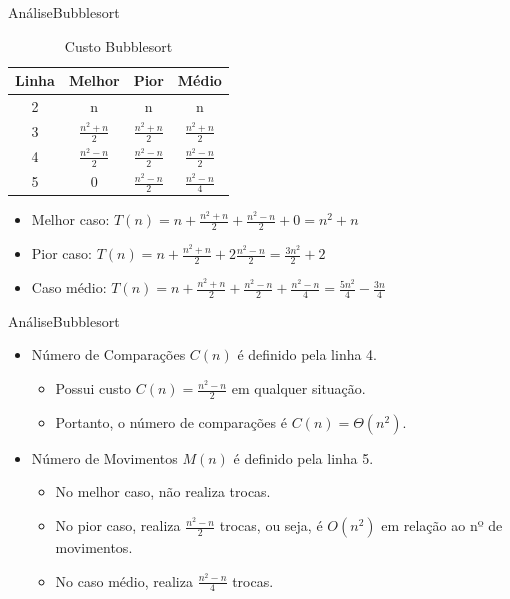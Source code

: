 \documentclass[aspectratio=169]{beamer}
\begin{document}

\begin{frame}[fragile]{Análise}{Bubblesort}
\begin{table}[]
\centering
\caption{Custo Bubblesort}
\label{Custo Bubblesort}
\begin{tabular}{c|ccc}
Linha  &  Melhor  &  Pior  &  Médio  \\
\hline
2       & n  & n  &  n \\
3       & $\frac{n^2 + n}{2}$ & $\frac{n^2 + n}{2}$ & $\frac{n^2 + n}{2}$ \\
4       &$\frac{n^2 - n}{2}$ & $\frac{n^2 - n}{2}$ & $\frac{n^2 - n}{2}$ \\
5       & 0 &$\frac{n^2 - n}{2}$& $\frac{n^2 - n}{4}$ \\ 
\end{tabular}
\end{table} 

\begin{itemize}
 \item Melhor caso: $T(n) = n + \frac{n^2+n}{2} + \frac{n^2-n}{2} + 0 = n^2 + n$

 \item Pior caso: $T(n) = n + \frac{n^2+n}{2} + 2\frac{n^2-n}{2} = \frac{3n^2}{2} + 2$
 
 \item Caso médio: $T(n) = n + \frac{n^2+n}{2} + \frac{n^2-n}{2} + \frac{n^2-n}{4} = \frac{5n^2}{4} - \frac{3n}{4}$  
\end{itemize}
\end{frame}


\begin{frame}[fragile]{Análise}{Bubblesort}
\begin{itemize}
 \item Número de Comparações $C(n)$ é definido pela linha 4.
 \begin{itemize}
 \item Possui custo $C(n) = \frac{n^2-n}{2}$ em qualquer situação.
 \item Portanto, o número de comparações é $C(n) = \Theta(n^2)$.
 \end{itemize}
\item Número de Movimentos $M(n)$ é definido pela linha 5.
 \begin{itemize}
 \item No melhor caso, não realiza trocas.
 \item No pior caso, realiza $\frac{n^2-n}{2}$ trocas, ou seja, é $O(n^2)$ em relação ao nº de movimentos.
 \item No caso médio, realiza $\frac{n^2-n}{4}$ trocas.
 \end{itemize} 
\end{itemize}

\end{frame}
\end{document}
